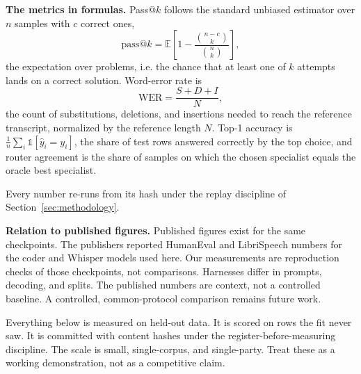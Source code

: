 \documentclass[11pt]{article}
\begin{document}
\textbf{The metrics in formulas.} Pass@$k$ follows the standard
unbiased estimator over $n$ samples with $c$ correct ones,
\begin{equation}
    \mathrm{pass@}k = \mathbb{E}\left[1 -
        \frac{\binom{n-c}{k}}{\binom{n}{k}}\right],
\end{equation}
the expectation over problems, i.e. the chance that at
least one of $k$ attempts lands on a correct solution.
Word-error rate is
\begin{equation}
    \mathrm{WER} = \frac{S + D + I}{N},
\end{equation}
the count of substitutions, deletions, and insertions needed to
reach the reference transcript, normalized by the reference
length $N$. Top-1 accuracy is
$\frac{1}{n}\sum_i \mathbb{1}[\hat y_i = y_i]$, the share of
test rows answered correctly by the top choice, and router
agreement is the share of samples on which the chosen specialist
equals the oracle best specialist.

Every number re-runs from its hash under the replay discipline of
Section~\ref{sec:methodology}.

\textbf{Relation to published figures.} Published figures exist
for the same checkpoints. The publishers reported HumanEval and
LibriSpeech numbers for the coder and Whisper models used here.
Our measurements are reproduction checks of those checkpoints,
not comparisons. Harnesses differ in prompts, decoding, and
splits. The published numbers are context, not a controlled
baseline. A controlled, common-protocol comparison remains future
work.

Everything below is measured on held-out data. It is scored on
rows the fit never saw. It is committed with content hashes under the
register-before-measuring discipline. The scale is small,
single-corpus, and single-party. Treat these as a working
demonstration, not as a competitive claim.
\end{document}
